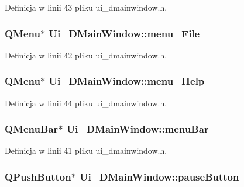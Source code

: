Definicja w linii 43 pliku ui\-\_\-dmainwindow.\-h.

\hypertarget{class_ui___d_main_window_a991f4d15852faf04d8c12694b3e077ad}{
\subsubsection[{menu\-\_\-\-File}]{\setlength{\rightskip}{0pt plus 5cm}Q\-Menu$\ast$ Ui\-\_\-\-D\-Main\-Window\-::menu\-\_\-\-File}}\label{class_ui___d_main_window_a991f4d15852faf04d8c12694b3e077ad}


Definicja w linii 42 pliku ui\-\_\-dmainwindow.\-h.

\hypertarget{class_ui___d_main_window_ac2997077098614d72b21d29c7a48350c}{
\subsubsection[{menu\-\_\-\-Help}]{\setlength{\rightskip}{0pt plus 5cm}Q\-Menu$\ast$ Ui\-\_\-\-D\-Main\-Window\-::menu\-\_\-\-Help}}\label{class_ui___d_main_window_ac2997077098614d72b21d29c7a48350c}


Definicja w linii 44 pliku ui\-\_\-dmainwindow.\-h.

\hypertarget{class_ui___d_main_window_a788ef749d82ca070e467e55cca0d47dd}{
\subsubsection[{menu\-Bar}]{\setlength{\rightskip}{0pt plus 5cm}Q\-Menu\-Bar$\ast$ Ui\-\_\-\-D\-Main\-Window\-::menu\-Bar}}\label{class_ui___d_main_window_a788ef749d82ca070e467e55cca0d47dd}


Definicja w linii 41 pliku ui\-\_\-dmainwindow.\-h.

\hypertarget{class_ui___d_main_window_a70e142e35db4995a1fefa082406bdef3}{
\subsubsection[{pause\-Button}]{\setlength{\rightskip}{0pt plus 5cm}Q\-Push\-Button$\ast$ Ui\-\_\-\-D\-Main\-Window\-::pause\-Button}}\label{class_ui___d_main_window_a70e142e35db4995a1fefa082406bdef3}


